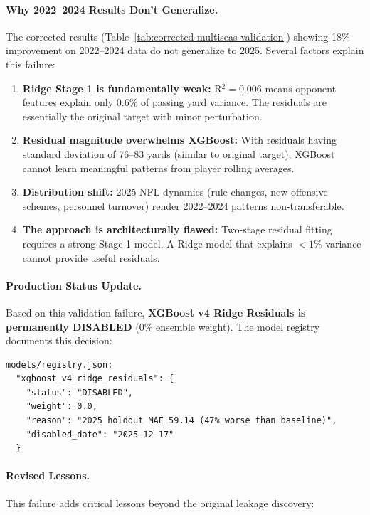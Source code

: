 \paragraph{Why 2022--2024 Results Don't Generalize.}
The corrected results (Table~\ref{tab:corrected-multiseas-validation}) showing 18\% improvement on 2022--2024 data do not generalize to 2025. Several factors explain this failure:

\begin{enumerate}[itemsep=2pt,parsep=0pt]
    \item \textbf{Ridge Stage 1 is fundamentally weak:} R$^2 = 0.006$ means opponent features explain only 0.6\% of passing yard variance. The residuals are essentially the original target with minor perturbation.

    \item \textbf{Residual magnitude overwhelms XGBoost:} With residuals having standard deviation of 76--83 yards (similar to original target), XGBoost cannot learn meaningful patterns from player rolling averages.

    \item \textbf{Distribution shift:} 2025 NFL dynamics (rule changes, new offensive schemes, personnel turnover) render 2022--2024 patterns non-transferable.

    \item \textbf{The approach is architecturally flawed:} Two-stage residual fitting requires a strong Stage 1 model. A Ridge model that explains $< 1\%$ variance cannot provide useful residuals.
\end{enumerate}

\paragraph{Production Status Update.}
Based on this validation failure, \textbf{XGBoost v4 Ridge Residuals is permanently DISABLED} (0\% ensemble weight). The model registry documents this decision:

\begin{verbatim}
models/registry.json:
  "xgboost_v4_ridge_residuals": {
    "status": "DISABLED",
    "weight": 0.0,
    "reason": "2025 holdout MAE 59.14 (47% worse than baseline)",
    "disabled_date": "2025-12-17"
  }
\end{verbatim}

\paragraph{Revised Lessons.}
This failure adds critical lessons beyond the original leakage discovery:

